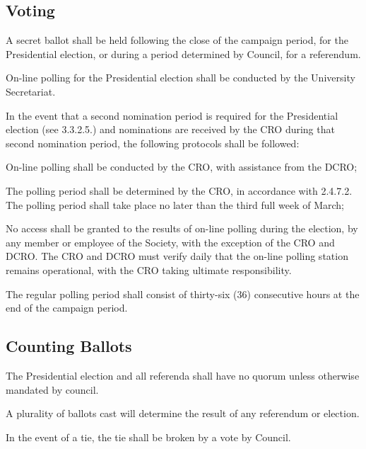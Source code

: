 \subsection{Voting}
\begin{longenum}[ label*=\thesubsection.\arabic*., align=left]
	\item A secret ballot shall be held following the close of the campaign period, for the Presidential election, or during a period determined by Council, for a referendum.
	\begin{longenum}[ label*=\arabic*., align=left]
		\item On-line polling for the Presidential election shall be conducted by the University Secretariat.
		\item In the event that a second nomination period is required for the Presidential election (see 3.3.2.5.) and nominations are received by the CRO during that second nomination period, the following protocols shall be followed:
		\begin{longenum}[ label*=\arabic*., align=left]
			\item On-line polling shall be conducted by the CRO, with assistance from the DCRO;
			\item The polling period shall be determined by the CRO, in accordance with 2.4.7.2. The polling period shall take place no later than the third full week of March;
			\item No access shall be granted to the results of on-line polling during the election, by any member or employee of the Society, with the exception of the CRO and DCRO. The CRO and DCRO must verify daily  that the on-line polling station remains operational, with the CRO taking ultimate responsibility.
			\end{longenum}
		 	\end{longenum}
    \item The regular polling period shall consist of thirty-six (36) consecutive hours at the end of the campaign period.
   
\end{longenum}
\subsection{Counting Ballots}

\begin{longenum}[ label*=\thesubsection.\arabic*., align=left]
	\item The Presidential election and all referenda shall have no quorum unless otherwise mandated by council.
    \item A plurality of ballots cast will determine the result of any referendum or election.
    \item In the event of a tie, the tie shall be broken by a vote by Council.
\end{longenum}

